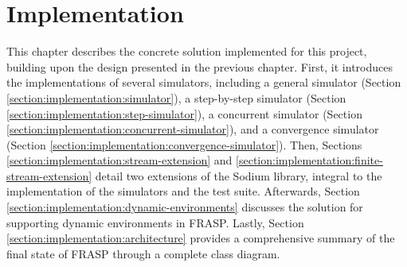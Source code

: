 
\chapter{Implementation}
\label{chapter:implementation}

This chapter describes the concrete solution implemented for this project,
building upon the design presented in the previous chapter. First, it
introduces the implementations of several simulators, including a general
simulator (Section \ref{section:implementation:simulator}), a step-by-step
simulator (Section \ref{section:implementation:step-simulator}), a concurrent
simulator (Section \ref{section:implementation:concurrent-simulator}), and a
convergence simulator (Section
\ref{section:implementation:convergence-simulator}). Then, Sections
\ref{section:implementation:stream-extension} and
\ref{section:implementation:finite-stream-extension} detail two extensions of
the Sodium library, integral to the implementation of the simulators and the
test suite. Afterwards, Section
\ref{section:implementation:dynamic-environments} discusses the solution for
supporting dynamic environments in FRASP. Lastly, Section
\ref{section:implementation:architecture} provides a comprehensive summary of
the final state of FRASP through a complete class diagram.








